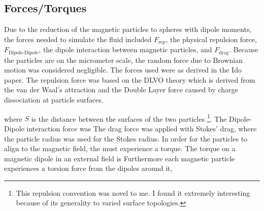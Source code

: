 \begin{multicols*}{2}
\subsection*{Forces/Torques}

Due to the reduction of the magnetic particles to spheres with dipole
moments, the forces needed to simulate the fluid included
$F_\text{rep}$, the physical repulsion force,
$F_\text{Dipole-Dipole}$, the dipole interaction between magnetic
particles, and $F_\text{drag}$. Because the particles are on the
micrometer scale, the random force due to Brownian motion was
considered negligible. The forces used were as derived in the Ido
paper\cite{1}. The repulsion force was based on the DLVO theory which
is derived from the van der Waal's attraction and the Double Layer
force caused by charge dissociation at particle surfaces. 

where $S$ is the distance between the surfaces of the two particles
\footnote{This repulsion convention was novel to me.  I found it
  extremely interesting because of its generality to varied surface
  topologies.}. The Dipole-Dipole interaction force was 
The drag force was applied with Stokes' drag,
where the particle radius was used for the Stokes radius. In order for
the particles to align to the magnetic field, the must experience a
torque.  The torque on a magnetic dipole in an external field is
Furthermore each magnetic particle experiences a torsion force from
the dipoles around it,


\end{multicols*}
